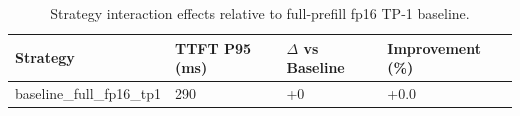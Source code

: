 \begin{table}
\caption{Strategy interaction effects relative to full-prefill fp16 TP-1 baseline.}
\label{tab:interactions}
\begin{tabular}{llll}
\toprule
Strategy & TTFT P95 (ms) & $\Delta$ vs Baseline & Improvement (\%) \\
\midrule
baseline\_full\_fp16\_tp1 & 290 & +0 & +0.0 \\
\bottomrule
\end{tabular}
\end{table}

